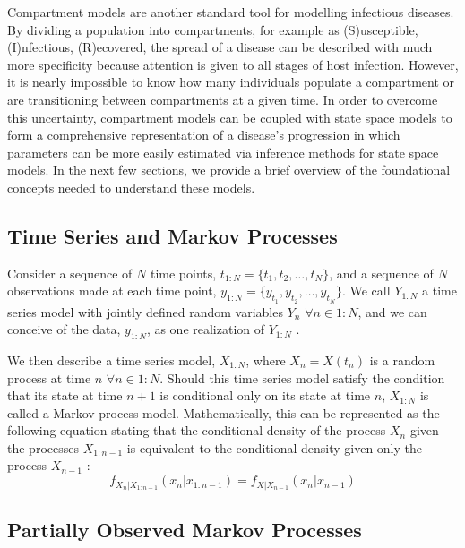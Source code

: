 \documentclass[12pt]{article}
\begin{document}
  Compartment models are another standard tool for modelling infectious diseases. By dividing a population into compartments, for example as (S)usceptible, (I)nfectious, (R)ecovered, the spread of a disease can be described with much more specificity because attention is given to all stages of host infection. However, it is nearly impossible to know how many individuals populate a compartment or are transitioning between compartments at a given time. In order to overcome this uncertainty, compartment models can be coupled with state space models to form a comprehensive representation of a disease's progression in which parameters can be more easily estimated via inference methods for state space models. In the next few sections, we provide a brief overview of the foundational concepts needed to understand these models.

\subsection{Time Series and Markov Processes}

  Consider a sequence of $N$ time points, $t_{1:N} = \{ t_1, t_2, \dots, t_N \}$, and a sequence of $N$ observations made at each time point, $y_{1:N} = \{ y_{t_1}, y_{t_2}, \dots, y_{t_N} \}$. We call $Y_{1:N}$ a time series model with jointly defined random variables $Y_n$ \hspace{1mm} $\forall n \in 1:N$, and we can conceive of the data, $y_{1:N}$, as one realization of $Y_{1:N}$ \cite{Shumway_ch1}.
  
  We then describe a time series model, $X_{1:N}$, where $X_n = X(t_n)$ is a random process at time $n$ \hspace{1mm} $\forall n \in 1:N$. Should this time series model satisfy the condition that its state at time $n + 1$ is conditional only on its state at time $n$, $X_{1:N}$ is called a Markov process model. Mathematically, this can be represented as the following equation stating that the conditional density of the process $X_n$ given the processes $X_{1:n-1}$ is equivalent to the conditional density given only the process $X_{n-1}$ \cite{cham}:
        \begin{equation}
        f_{X_n|X_{1:n-1}}(x_n|x_{1:n-1}) = f_{X|X_{n-1}}(x_n|x_{n-1})
        \end{equation}

\subsection{Partially Observed Markov Processes}
\end{document}
